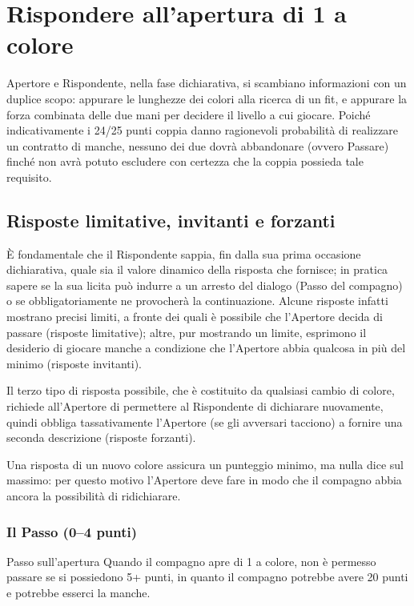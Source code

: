 \documentclass[../corsofiori.tex]{subfiles}
\begin{document}
\chapter{Rispondere all'apertura di 1 a colore}

Apertore e Rispondente, nella fase dichiarativa, si scambiano informazioni con un duplice scopo: appurare le lunghezze
dei colori alla ricerca di un fit, e appurare la forza combinata delle due mani per decidere il livello a cui giocare.
Poiché indicativamente i 24/25 punti coppia danno ragionevoli probabilità di realizzare un contratto di manche, nessuno
dei due dovrà abbandonare (ovvero Passare) finché non avrà potuto escludere con certezza che la coppia possieda tale
requisito.

\section{Risposte limitative, invitanti e forzanti}
\`E fondamentale che il Rispondente sappia, fin dalla sua prima occasione dichiarativa, quale sia il valore dinamico
della risposta che fornisce; in pratica sapere se la sua licita può indurre a un arresto del dialogo (Passo del
compagno) o se obbligatoriamente ne provocherà la continuazione. Alcune risposte infatti mostrano precisi limiti,
a fronte dei quali è possibile che l’Apertore decida di passare (risposte limitative); altre, pur mostrando un limite,
esprimono il desiderio di giocare manche a condizione che l’Apertore abbia qualcosa in più del minimo (risposte
invitanti).

Il terzo tipo di risposta possibile, che è costituito da qualsiasi cambio di colore, richiede all'Apertore di permettere
al Rispondente di dichiarare nuovamente, quindi obbliga tassativamente
l’Apertore (se gli avversari tacciono) a fornire una seconda descrizione (risposte forzanti).

Una risposta di un nuovo colore assicura un punteggio minimo, ma nulla dice sul massimo: per questo motivo l’Apertore
deve fare in modo che il compagno abbia ancora la possibilità di ridichiarare.

\subsection{Il Passo (0--4 punti)}

\begin{regola}{Passo sull'apertura}
    Quando il compagno apre di 1 a colore, non è permesso passare se si possiedono 5+ punti, in quanto il compagno
    potrebbe avere 20 punti e potrebbe esserci la manche.
\end{regola}
\end{document}
